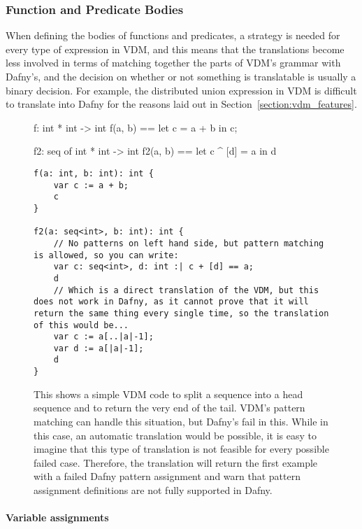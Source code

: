 \documentclass{entcs}
\begin{document}
\subsubsection{Function and Predicate Bodies}\label{section:expressions}

When defining the bodies of functions and predicates, a strategy is needed for every type of expression in VDM, and this means that the translations become less involved in terms of matching together the parts of VDM's grammar with Dafny's, and the decision on whether or not something is translatable is usually a binary decision. For example, the distributed union expression in VDM is difficult to translate into Dafny for the reasons laid out in Section~\ref{section:vdm_features}. 

\begin{figure}[h]
	\begin{center}
        \begin{vdmsl}
f: int * int -> int
f(a, b) == 
    let c = a + b in c;

f2: seq of int * int -> int 
f2(a, b) == 
    let c ^ [d] = a in d
        \end{vdmsl}
        \begin{lstlisting}
f(a: int, b: int): int {
    var c := a + b;
    c
}

f2(a: seq<int>, b: int): int {
    // No patterns on left hand side, but pattern matching is allowed, so you can write:
    var c: seq<int>, d: int :| c + [d] == a;
    d
    // Which is a direct translation of the VDM, but this does not work in Dafny, as it cannot prove that it will return the same thing every single time, so the translation of this would be...
    var c := a[..|a|-1];
    var d := a[|a|-1];
    d
}
        \end{lstlisting}
		\caption{This shows a simple VDM code to split a sequence into a head sequence and to return the very end of the tail. VDM's pattern matching can handle this situation, but Dafny's fail in this. While in this case, an automatic translation would be possible, it is easy to imagine that this type of translation is not feasible for every possible failed case. Therefore, the translation will return the first example with a failed Dafny pattern assignment and warn that pattern assignment definitions are not fully supported in Dafny.}\label{fig:vdm_pattern_assignment}
	\end{center}
\end{figure}

\paragraph{Variable assignments}\label{section:variable_assignment_problems}
\end{document}
